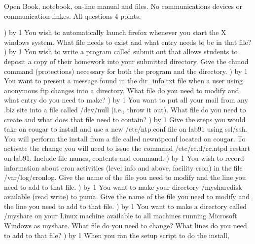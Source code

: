 
\parindent=0in
\nopagenumbers
\newcount\quesno
{}
\def\ques{\number\quesno) \advance\quesno by 1}
\def\aspace{\vskip 1.5in}

Open Book, notebook, on-line manual and files.
No communications devices or communication linkes.
All questions 4 points.

\ques
You wish to automatically launch {\ltt{}firefox} whenever you start the
X windows system.
What file needs to exist and what entry needs to be in that file?
\vskip 1.8in
\ques
You wish to write a program called {\ltt{}submit.out} that allows students
to deposit a copy of their homework into your {\ltt{}submitted} directory.
Give the {\ltt{}chmod} command (protections) necessary for both the
program and the directory.
\vskip 1.4in
\ques
You want to present a message found in the {\ltt{}dir_info.txt} file
when a user using anonymous ftp changes into a directory.
What file do you need to modify and what entry do you need to make?
\vskip 1.4in
\ques
You want to put all your mail from any {\ltt{}.biz} site 
into a file called {\ltt{}/dev/null} (i.e., throw it out).
What file do you need to create and what does that file need to contain?
\vskip 1.6in
\vfill\eject
\ques
Give the steps you would take on {\ltt{}cougar} to install and use
a new {\ltt{}/etc/ntp.conf} file on {\ltt{}lab91} using ssl/ssh.
You will perform the install from a file called {\ltt{}newntpconf}
located on {\ltt{}cougar}.
To activate the change you will need to issue the command
{\ltt{}/etc/rc.d/rc.ntpd restart} on {\ltt{}lab91}.
Include file names, contents and command.
\vskip 2.6in
\ques
You wish to record information about cron activities
(level {\ltt{}info} and above, facility {\ltt{}cron}) in
the file {\ltt{}/var/log/cronlog}.
Give the name of the file you need to modify and the line you need to
add to that file.
\vskip 1.0in
\ques
You want to make your directory 
{\ltt{}/mysharedisk}
available (read write) to {\ltt{}puma}.
Give the name of the file you need to modify and the line you need to
add to that file.
\vskip 1.0in
\ques
You want to make a directory called {\ltt{}/myshare} on your
Linux machine available to all machines running Microsoft Windows as
{\ltt{}myshare}.
What file do you need to change?
What lines do you need to add to that file?
\vskip 1.2in
\vfill\eject
\ques
When you ran the setup script to do the install,
